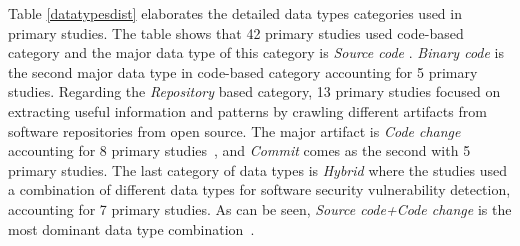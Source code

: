 Table \ref{datatypesdist} elaborates the detailed data types categories used in primary studies. The table shows that 42 primary studies used code-based category and the major data type of this category is \textit{Source code} \cite{zheng2021vulspg, duan2019vulsniper, yamaguchi2011vulnerability, li2021vulnerability, zou2019mu, li2021vuldeelocator, filus2020random, li2021sysevr, lin2019software, li2017software, zhuang2020smart, ziems2021security}. 
\textit{Binary code} is the second major data type in code-based category \cite{phan2017convolutional, huang2021hunting, yan2021han, nguyen2020deep} accounting for 5 primary studies. %
Regarding the \textit{Repository} based category, 13 primary studies focused on extracting useful information and patterns by crawling different artifacts from software repositories from open source. The major artifact is \textit{Code change} accounting for 8 primary studies~\cite{chen2021neural, fu2022linevul, hin2022linevd, 3360588, dinella2020hoppity, zhou2019devign, pradel2018deepbugs, liu2019deepbalance}, and \textit{Commit} comes as the second with 5 primary studies. The last category of data types is \textit{Hybrid} where the studies used a combination of different data types for software security vulnerability detection, accounting for 7 primary studies. As can be seen, \textit{Source code+Code change} is the most dominant data type combination~\cite{wang2020combining, le2021deepcva, cheng2021deepwukong}.







